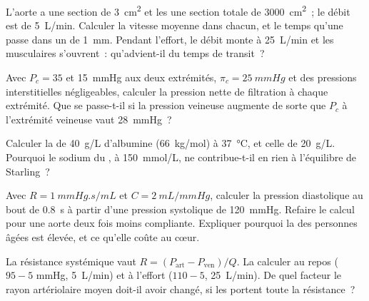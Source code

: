 \begin{exercise}[$\star\star$]\label{exo:b2:blood-circulation:7}
L'aorte a une section de \qty{3}{cm^2} et les  une section
totale de \qty{3000}{cm^2}~; le débit est de \qty{5}{L/min}. Calculer la
vitesse moyenne dans chacun, et le temps qu'une  passe dans un
 de \qty{1}{mm}. Pendant l'effort, le débit monte à
\qty{25}{L/min} et les  musculaires s'ouvrent~: qu'advient-il
du temps de transit~?
\end{exercise}

\begin{exercise}[$\star\star$]\label{exo:b2:blood-circulation:8}
Avec $P_c = 35$ et \qty{15}{mmHg} aux deux extrémités, $\pi_c =
\qty{25}{mmHg}$ et des pressions interstitielles négligeables, calculer
la pression nette de filtration à chaque extrémité. Que se passe-t-il si
la pression veineuse augmente de sorte que $P_c$ à l'extrémité veineuse
vaut \qty{28}{mmHg}~?
\end{exercise}

\begin{exercise}[$\star\star$]\label{exo:b2:blood-circulation:9}
Calculer la  de \qty{40}{g/L} d'albumine
(\qty{66}{kg/mol}) à \qty{37}{\celsius}, et celle de \qty{20}{g/L}.
Pourquoi le sodium du , à \qty{150}{mmol/L}, ne contribue-t-il en
rien à l'équilibre de Starling~?
\end{exercise}

\begin{exercise}[$\star\star\star$]\label{exo:b2:blood-circulation:10}
Avec $R = \qty{1}{mmHg.s/mL}$ et $C = \qty{2}{mL/mmHg}$, calculer la
pression diastolique au bout de \qty{0.8}{s} à partir d'une pression
systolique de \qty{120}{mmHg}. Refaire le calcul pour une aorte deux
fois moins compliante. Expliquer pourquoi la  des
personnes âgées est élevée, et ce qu'elle coûte au cœur.
\end{exercise}

\begin{exercise}[$\star\star\star$]\label{exo:b2:blood-circulation:11}
La résistance systémique vaut $R = (P_{\text{art}} - P_{\text{ven}})/Q$.
La calculer au repos ($95 - 5$ mmHg, \qty{5}{L/min}) et à l'effort
($110 - 5$, \qty{25}{L/min}). De quel facteur le rayon artériolaire moyen
doit-il avoir changé, si les  portent toute la résistance~?
\end{exercise}

